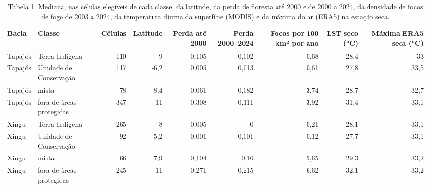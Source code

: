 \begin{table}
\caption{Tabela 1. Mediana, nas células elegíveis de cada classe, da latitude, da perda de floresta até 2000 e de 2000 a 2024, da densidade de focos de fogo de 2003 a 2024, da temperatura diurna da superfície (MODIS) e da máxima do ar (ERA5) na estação seca.}
\label{tab:11_territorio::classes}
\begin{tabular}{llrrrrrrr}
\toprule
Bacia & Classe & Células & Latitude & Perda até 2000 & Perda 2000–2024 & Focos por 100 km² por ano & LST seco (°C) & Máxima ERA5 seca (°C) \\
\midrule
Tapajós & Terra Indígena & 110 & -9 & 0,105 & 0,002 & 0,68 & 28,4 & 33 \\
Tapajós & Unidade de Conservação & 117 & -6,2 & 0,005 & 0,013 & 0,61 & 27,8 & 33,5 \\
Tapajós & mista & 78 & -8,4 & 0,061 & 0,082 & 3,74 & 28,7 & 32,7 \\
Tapajós & fora de áreas protegidas & 347 & -11 & 0,308 & 0,111 & 3,92 & 31,4 & 33,1 \\
Xingu & Terra Indígena & 265 & -8 & 0,005 & 0 & 0,21 & 28,1 & 33,1 \\
Xingu & Unidade de Conservação & 92 & -5,2 & 0,001 & 0,001 & 0,12 & 27,7 & 33,1 \\
Xingu & mista & 66 & -7,9 & 0,104 & 0,16 & 5,65 & 29,3 & 33,2 \\
Xingu & fora de áreas protegidas & 245 & -11 & 0,271 & 0,215 & 6,62 & 32,1 & 33,2 \\
\bottomrule
\end{tabular}
\end{table}
